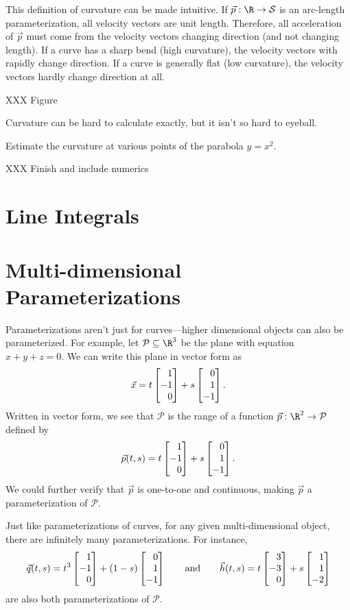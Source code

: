 This definition of curvature can be made intuitive.  If $\vec p:\R\to\mathcal S$ is an arc-length parameterization,
all velocity vectors are unit length.  Therefore, all acceleration of $\vec p$ must come from
the velocity vectors changing direction (and not changing length).  If a curve has a sharp bend (high curvature),
the velocity vectors with rapidly change direction.  If a curve is generally flat (low curvature),
the velocity vectors hardly change direction at all.

XXX Figure

Curvature can be hard to calculate exactly, but it isn't so hard to eyeball.

\begin{example}
	Estimate the curvature at various points of the parabola $y=x^2$.

	XXX Finish and include numerics
\end{example}

\begin{exercises}
\end{exercises}

\section{Line Integrals}

\section{Multi-dimensional Parameterizations}

Parameterizations aren't just for curves---higher dimensional objects can also be parameterized.
For example, let $\mathcal P\subseteq \R^3$ be the plane with equation $x+y+z=0$.  We can write this plane
in vector form as 
\[
	\vec x = t\mat{1\\-1\\0} + s\mat{0\\1\\-1}.	
\]
Written in vector form, we see that $\mathcal P$ is the range of a function $\vec p:\R^2\to\mathcal P$
defined by 
\[
	\vec p(t,s) = t\mat{1\\-1\\0} + s\mat{0\\1\\-1}.
\]
We could further verify that $\vec p$ is one-to-one and continuous,  
making $\vec p$ a parameterization
of $\mathcal P$.

Just like parameterizations of curves, for any given multi-dimensional object, there are
infinitely many parameterizations.  For instance,
\[
	\vec q(t,s) = t^3\mat{1\\-1\\0} + (1-s)\mat{0\\1\\-1}\qquad\text{and}\qquad
	\vec h(t,s) = t\mat{3\\-3\\0} + s\mat{1\\1\\-2}
\]
are also both parameterizations of $\mathcal P$.


